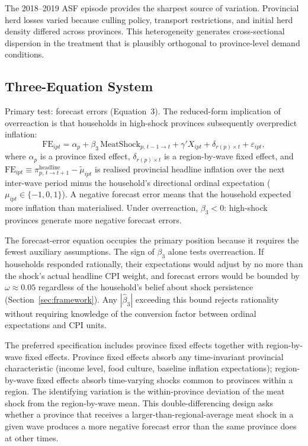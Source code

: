 The 2018--2019 ASF episode provides the sharpest source of
variation.
Provincial herd losses varied because culling policy, transport
restrictions, and initial herd density differed across provinces.
This heterogeneity generates cross-sectional dispersion in the
treatment that is plausibly orthogonal to province-level demand
conditions.

\subsection{Three-Equation System}\label{sec:three_equations}

Primary test: forecast errors (Equation~3).
The reduced-form implication of overreaction is that households
in high-shock provinces subsequently overpredict inflation:
\begin{equation}\label{eq:eq3}
  \mathrm{FE}_{ipt}
  = \alpha_p
  + \beta_3\,\mathrm{MeatShock}_{p,\,t-1\to t}
  + \gamma' X_{ipt}
  + \delta_{r(p)\times t}
  + \varepsilon_{ipt},
\end{equation}
where $\alpha_p$ is a province fixed effect,
$\delta_{r(p)\times t}$ is a region-by-wave fixed effect,
and $\mathrm{FE}_{ipt}
  \equiv \pi^{\mathrm{headline}}_{p,\,t\to t+1}
  - \tilde{\mu}_{ipt}$ is realised provincial headline inflation
over the next inter-wave period minus the household's directional
ordinal expectation ($\mu_{ipt} \in \{-1, 0, 1\}$).
A negative forecast error means that the household expected more
inflation than materialised.
Under overreaction, $\beta_3 < 0$: high-shock provinces generate
more negative forecast errors.

The forecast-error equation occupies the primary position because
it requires the fewest auxiliary assumptions.
The sign of $\beta_3$ alone tests overreaction.
If households responded rationally, their expectations would
adjust by no more than the shock's actual headline CPI weight,
and forecast errors would be bounded by
$\omega \approx 0.05$ regardless of the household's belief about
shock persistence (Section~\ref{sec:framework}).
Any $|\hat{\beta}_3|$ exceeding this bound rejects rationality
without requiring knowledge of the conversion factor between
ordinal expectations and CPI units.

The preferred specification includes province fixed effects
together with region-by-wave fixed effects.
Province fixed effects absorb any time-invariant provincial
characteristic (income level, food culture, baseline inflation
expectations); region-by-wave fixed effects absorb
time-varying shocks common to provinces within a region.
The identifying variation is the within-province deviation
of the meat shock from the region-by-wave mean.
This double-differencing design asks whether a province that
receives a larger-than-regional-average meat shock in a given
wave produces a more negative forecast error than the same
province does at other times.


